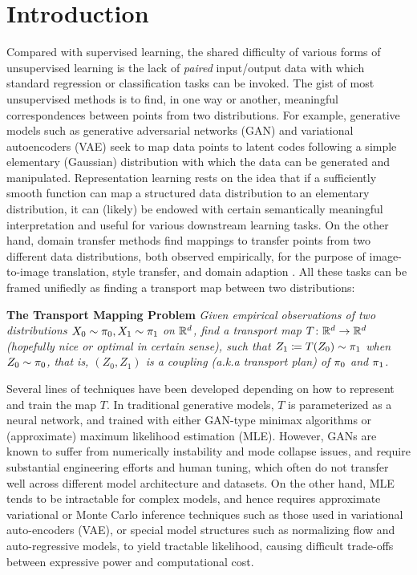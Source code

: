 

\section{Introduction} 

Compared with supervised learning, 
the shared difficulty of various forms of unsupervised learning is the lack of 
\emph{paired} input/output data  
with which standard regression or classification tasks can be invoked. 
The gist of 
most unsupervised methods is to 
find, in one way or another,  meaningful correspondences between 
points from two distributions. 
For example, generative models such as 
generative adversarial networks (GAN) 
and variational autoencoders (VAE) 
\cite[e.g.,][]{goodfellow2014generative, kingma2013auto, dinh2016density}
seek to 
map data points 
to latent codes 
following 
a simple elementary (Gaussian) distribution
with which the data can be generated and manipulated. 
Representation learning 
rests on the idea that 
if a sufficiently smooth function can map
a structured data distribution to an elementary 
distribution, it can (likely) be endowed 
with certain  semantically meaningful interpretation
and useful for various downstream learning tasks.  
On the other hand, 
domain transfer methods 
find mappings to transfer points 
from two different data distributions, 
both observed empirically, 
for the purpose of image-to-image translation,  %
style transfer, and domain adaption \citep[e.g.,][]{cyclegan, flamary2016optimal, trigila2016data, peyre2019computational}.
All these tasks can be framed  unifiedly %
as finding a transport map between two distributions: 

\noindent\textbf{The Transport Mapping Problem}  
\emph{Given empirical observations 
of two distributions $X_0\sim {\pi}_0,  X_1\sim {\pi}_1$ on $\mathbb{R}^d$, 
find a %
transport map $T\colon\mathbb{R}^d\to\mathbb{R}^d$ (hopefully nice or optimal in certain sense),  
such that $Z_1 \coloneqq T(Z_0)\sim {\pi}_1$ when $Z_0 \sim {\pi}_0$, that is, $(Z_0,Z_1)$ is a coupling (a.k.a transport plan) of ${\pi}_0$ and ${\pi}_1$.  
}



Several lines of techniques have been developed depending on how to  represent and train  the map $T$. 
In traditional generative models, 
$T$ 
is parameterized as a neural network, 
and trained with either 
GAN-type minimax algorithms or (approximate) maximum likelihood estimation (MLE).  
However, GANs are known to suffer from numerically instability  and mode collapse issues,  
and require substantial engineering efforts 
and human tuning, which often do not transfer well across different model architecture and datasets.  
On the other hand, MLE tends to be intractable for complex models, 
and hence
requires 
approximate variational or Monte Carlo inference techniques  
such as those used in variational auto-encoders (VAE), 
or special model structures  
such as normalizing flow and auto-regressive models, to yield tractable likelihood, causing  difficult trade-offs between expressive power and computational cost. %



